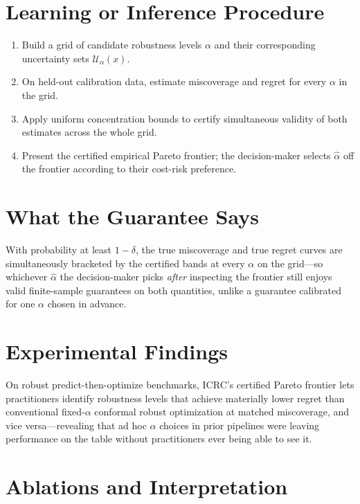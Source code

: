 \documentclass[10pt,twocolumn]{article}
\begin{document}
\section{Learning or Inference Procedure}

\begin{enumerate}[itemsep=2pt,parsep=0pt]
  \item Build a grid of candidate robustness levels $\alpha$ and their
    corresponding uncertainty sets $\mathcal{U}_\alpha(x)$.
  \item On held-out calibration data, estimate miscoverage and regret
    for every $\alpha$ in the grid.
  \item Apply uniform concentration bounds to certify simultaneous
    validity of both estimates across the whole grid.
  \item Present the certified empirical Pareto frontier; the
    decision-maker selects $\hat\alpha$ off the frontier according to
    their cost-risk preference.
\end{enumerate}

\section{What the Guarantee Says}

With probability at least $1-\delta$, the true miscoverage and true
regret curves are simultaneously bracketed by the certified bands at
every $\alpha$ on the grid---so whichever $\hat\alpha$ the
decision-maker picks \emph{after} inspecting the frontier still enjoys
valid finite-sample guarantees on both quantities, unlike a guarantee
calibrated for one $\alpha$ chosen in advance.

\section{Experimental Findings}

On robust predict-then-optimize benchmarks, ICRC's certified Pareto
frontier lets practitioners identify robustness levels that achieve
materially lower regret than conventional fixed-$\alpha$ conformal
robust optimization at matched miscoverage, and vice versa---revealing
that ad hoc $\alpha$ choices in prior pipelines were leaving performance
on the table without practitioners ever being able to see it.

\section{Ablations and Interpretation}
\end{document}
